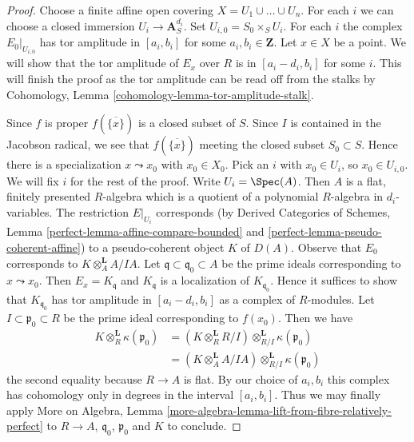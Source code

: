 \begin{proof}
Choose a finite affine open covering $X = U_1 \cup \ldots \cup U_n$.
For each $i$ we can choose a closed immersion $U_i \to \mathbf{A}^{d_i}_S$.
Set $U_{i, 0} = S_0 \times_S U_i$.
For each $i$ the complex $E_0|_{U_{i, 0}}$ has tor amplitude
in $[a_i, b_i]$ for some $a_i, b_i \in \mathbf{Z}$.
Let $x \in X$ be a point.
We will show that the tor amplitude of
$E_x$ over $R$ is in $[a_i - d_i, b_i]$ for some $i$.
This will finish the proof as the tor amplitude can be
read off from the stalks by
Cohomology, Lemma \ref{cohomology-lemma-tor-amplitude-stalk}.

\medskip\noindent
Since $f$ is proper $f(\overline{\{x\}})$ is a closed subset of $S$.
Since $I$ is contained in the Jacobson radical, we see that
$f(\overline{\{x\}})$ meeting the closed subset $S_0 \subset S$.
Hence there is a specialization $x \leadsto x_0$ with $x_0 \in X_0$.
Pick an $i$ with $x_0 \in U_i$, so $x_0 \in U_{i, 0}$.
We will fix $i$ for the rest of the proof.
Write $U_i = \Spec(A)$. Then $A$ is a flat, finitely presented
$R$-algebra which is a quotient of a polynomial $R$-algebra in
$d_i$-variables. The restriction $E|_{U_i}$ corresponds
(by Derived Categories of Schemes, Lemma
\ref{perfect-lemma-affine-compare-bounded} and
\ref{perfect-lemma-pseudo-coherent-affine})
to a pseudo-coherent object $K$ of $D(A)$.
Observe that $E_0$ corresponds to $K \otimes_A^\mathbf{L} A/IA$.
Let $\mathfrak q \subset \mathfrak q_0 \subset A$ be the prime
ideals corresponding to $x \leadsto x_0$.
Then $E_x = K_{\mathfrak q}$ and $K_{\mathfrak q}$
is a localization of $K_{\mathfrak q_0}$. Hence it suffices
to show that $K_{\mathfrak q_0}$ has tor amplitude in
$[a_i - d_i, b_i]$ as a complex of $R$-modules.
Let $I \subset \mathfrak p_0 \subset R$ be the prime
ideal corresponding to $f(x_0)$.
Then we have
\begin{align*}
K \otimes_R^\mathbf{L} \kappa(\mathfrak p_0)
& =
(K \otimes_R^\mathbf{L} R/I) \otimes_{R/I}^\mathbf{L}
\kappa(\mathfrak p_0) \\
& =
(K \otimes_A^\mathbf{L} A/IA) \otimes_{R/I}^\mathbf{L} \kappa(\mathfrak p_0)
\end{align*}
the second equality because $R \to A$ is flat.
By our choice of $a_i, b_i$ this complex has cohomology
only in degrees in the interval $[a_i, b_i]$.
Thus we may finally apply
More on Algebra, Lemma
\ref{more-algebra-lemma-lift-from-fibre-relatively-perfect}
to $R \to A$, $\mathfrak q_0$, $\mathfrak p_0$ and $K$
to conclude.
\end{proof}










